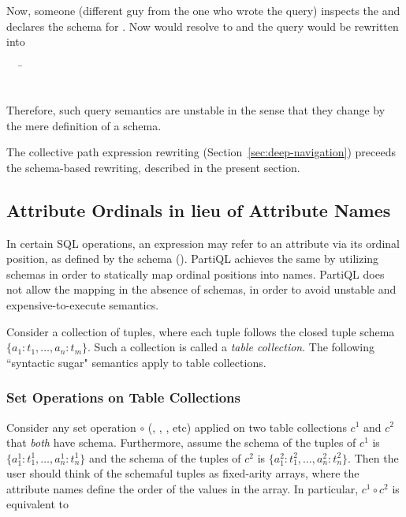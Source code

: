 {\begin{example}
Now, someone (different guy from the one who wrote the query) inspects the
 and declares the schema  for .
Now  would resolve to  and the query would be rewritten into

\begin{tabbing}
\ \ \ \=\\
\>\\
\>
\end{tabbing}

Therefore, such query semantics are unstable in the sense that they change by
the mere definition of a schema. 
\end{example}

 The collective path expression rewriting
(Section~\ref{sec:deep-navigation}) preceeds the schema-based rewriting,
described in the present section.

\subsection{Attribute Ordinals in lieu of Attribute Names}
\label{sec:ordinals-in-lieu-of-names}
In certain SQL operations, an expression may refer to an attribute via its
ordinal position, as defined by the schema (). PartiQL achieves
the same by utilizing schemas in order to statically map ordinal positions into
names. PartiQL does not allow the mapping in the absence of schemas, in order to
avoid unstable and expensive-to-execute semantics.

Consider a collection of tuples, where each tuple follows the closed tuple
schema $\{a_1:t_1,\ldots,a_n:t_m\}$. Such a collection is called a \textit{table
collection}. The following ``syntactic sugar" semantics apply to table
collections.

\subsubsection{Set Operations on Table Collections}
\label{sec:setops-on-tables}
Consider any set operation $\circ$ (, , ,
etc) applied on two table collections $c^1$ and $c^2$ that \textit{both} have
schema. Furthermore, assume the schema of the tuples of $c^1$ is
$\{a_1^1:t_1^1,\ldots,a_n^1:t_n^1\}$ and the schema of the tuples of $c^2$ is
$\{a_1^2:t_1^2,\ldots,a_n^2:t_n^2\}$. Then the user should think of the
schemaful tuples as fixed-arity arrays, where the attribute names define the
order of the values in the array. In particular, $c^1 \circ c^2$ is equivalent
to

}
